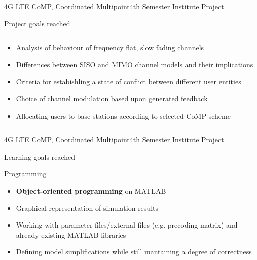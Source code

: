 \documentclass[xcolor={cmyk}]{beamer}
\begin{document}
\begin{frame}{4G LTE CoMP, Coordinated Multipoint}{4th Semester Institute Project}
	 \begin{block}{Project goals reached}
	 	\begin{columns}
			\begin{column}{.9\textwidth}
				\begin{itemize}
					\item Analysis of behaviour of frequency flat, slow fading channels
					\item Differences between SISO and MIMO channel models and their implications
					\item Criteria for estabishling a state of conflict between different user entities
					\item Choice of channel modulation based upon generated feedback
					\item Allocating users to base stations according to selected CoMP scheme
				\end{itemize}
			\end{column}
		\end{columns}
	 \end{block}
 \end{frame}


\begin{frame}{4G LTE CoMP, Coordinated Multipoint}{4th Semester Institute Project}
	 \begin{block}{Learning goals reached}
	 	 \hspace*{.1\linewidth}\begin{minipage}{.8\linewidth}
    		\begin{block}{Programming}
      			\begin{itemize}
      				\item \textbf{Object-oriented programming} on MATLAB
      				\item Graphical representation of simulation results
      				\item Working with parameter files/external files (e.g. precoding matrix) and already existing MATLAB libraries
      				\item Defining model simplifications while still mantaining a degree of correctness
      			\end{itemize}
    		\end{block}
    	\end{minipage}
	 \end{block}	 
 \end{frame}
\end{document}
